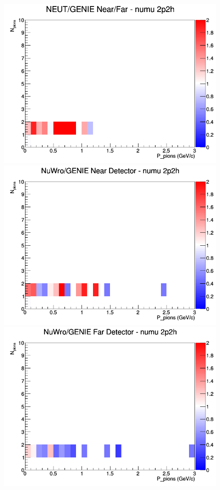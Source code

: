 \documentclass[12pt]{article}
\begin{document}
\begin{figure}[h]
\endminipage
{}
\includegraphics[width=\linewidth]{N_P/nominal/pions/ratios/2p2h_NEUT_GENIE_numu_NF_N_P.png}
\endminipage
\newline
{}
\includegraphics[width=\linewidth]{N_P/nominal/pions/ratios/2p2h_NuWro_GENIE_numu_near_N_P.png}
\endminipage
{}
\includegraphics[width=\linewidth]{N_P/nominal/pions/ratios/2p2h_NuWro_GENIE_numu_far_N_P.png}

\end{figure}
\end{document}
